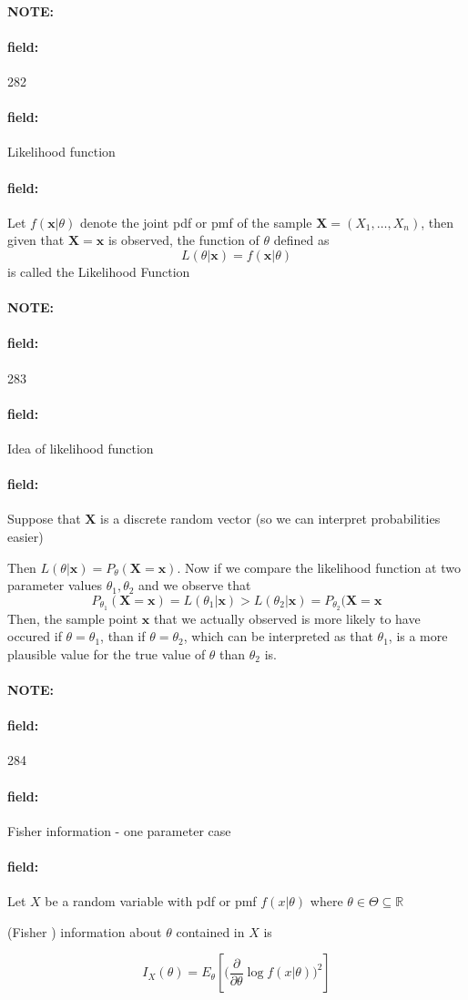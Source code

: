 \documentclass[12pt]{article}
\newenvironment{note}{\paragraph{NOTE:}}{}
\newenvironment{field}{\paragraph{field:}}{}
\begin{document}
\begin{note} \begin{field} \tiny 282 \end{field}
  \begin{field}
    Likelihood function
  \end{field}
  \begin{field}
    Let $f(\mathbf{x}|\theta)$ denote the joint pdf or pmf of the sample $\mathbf{X} = (X_1, \ldots , X_n)$, then given that $\mathbf{X} = \mathbf{x}$ is observed, the function of $\theta$ defined as $$L(\theta|\mathbf{x}) = f(\mathbf{x}|\theta)$$
    is called the Likelihood Function
  \end{field}
\end{note}

\begin{note} \begin{field} \tiny 283 \end{field}
  \begin{field}
    Idea of likelihood function
  \end{field}
  \begin{field}
    Suppose that $\mathbf{X}$ is a discrete random vector (so we can interpret probabilities easier)

    Then $L(\theta|\mathbf{x}) = P_\theta(\mathbf{X} = \mathbf{x})$. Now if we compare the likelihood function at two parameter values $\theta_1, \theta_2$ and we observe that $$P_{\theta_1}(\mathbf{X} = \mathbf{x}) = L(\theta_1|\mathbf{x}) > L(\theta_2|\mathbf{x}) = P_{\theta_2}(\mathbf{X} = \mathbf{x}$$
    Then, the sample point $\mathbf{x}$ that we actually observed is more likely to have occured if $\theta = \theta_1$, than if $\theta= \theta_2$, which can be interpreted as that $\theta_1$, is a more plausible value for the true value of $\theta$ than $\theta_2$ is.
  \end{field}
\end{note}


\begin{note} \begin{field} \tiny 284 \end{field}
  \begin{field}
    Fisher information - one parameter case
  \end{field}
  \begin{field}
    Let $X$ be a random variable with pdf or pmf $f(x |\theta)$ where $\theta \in \Theta \subseteq \mathbb{R}$

    (Fisher ) information about $\theta$ contained in $X$ is

    $$ I_{X}(\theta) = E_\theta[ \big(\frac{\partial}{\partial \theta} \log f(x|\theta)\big)^2]$$
  \end{field}
\end{note}
\end{document}

